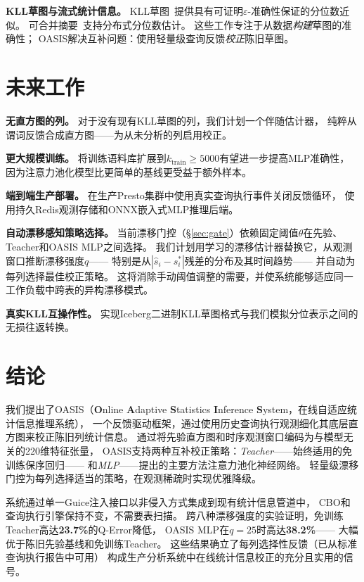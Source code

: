 \documentclass[runningheads]{llncs}
\begin{document}
\textbf{KLL草图与流式统计信息。}
KLL草图~\cite{ivkin2019kll}提供具有可证明$\varepsilon$-准确性保证的分位数近似。
可合并摘要~\cite{agarwal2013mergeable}支持分布式分位数估计。
这些工作专注于从数据\emph{构建}草图的准确性；
OASIS解决互补问题：使用轻量级查询反馈\emph{校正}陈旧草图。

\section{未来工作}
\label{sec:future}

\textbf{无直方图的列。}
对于没有现有KLL草图的列，我们计划一个伴随估计器，
纯粹从谓词反馈合成直方图——为从未分析的列启用校正。

\textbf{更大规模训练。}
将训练语料库扩展到$k_{\text{train}} \geq 5000$有望进一步提高MLP准确性，
因为注意力池化模型比更简单的基线更受益于额外样本。

\textbf{端到端生产部署。}
在生产Presto集群中使用真实查询执行事件关闭反馈循环，
使用持久Redis观测存储和ONNX嵌入式MLP推理后端。

\textbf{自动漂移感知策略选择。}
当前漂移门控（\S\ref{sec:gate}）依赖固定阈值$\theta$在先验、Teacher和OASIS MLP之间选择。
我们计划用学习的漂移估计器替换它，从观测窗口推断漂移强度$q$——
特别是从$|\hat{s}_i - s^*_i|$残差的分布及其时间趋势——
并自动为每列选择最佳校正策略。
这将消除手动阈值调整的需要，并使系统能够适应同一工作负载中跨表的异构漂移模式。

\textbf{真实KLL互操作性。}
实现Iceberg二进制KLL草图格式与我们模拟分位表示之间的无损往返转换。

\section{结论}
\label{sec:conclusion}

我们提出了OASIS（\textbf{O}nline \textbf{A}daptive \textbf{S}tatistics
\textbf{I}nference \textbf{S}ystem，在线自适应统计信息推理系统），
一个反馈驱动框架，通过使用历史查询执行观测细化其底层直方图来校正陈旧列统计信息。
通过将先验直方图和时序观测窗口编码为与模型无关的220维特征张量，
OASIS支持两种互补校正策略：\emph{Teacher}——始终适用的免训练保序回归——
和\emph{MLP}——提出的主要方法注意力池化神经网络。
轻量级漂移门控为每列选择适当的策略，在观测稀疏时实现优雅降级。

系统通过单一Guice注入接口以非侵入方式集成到现有统计信息管道中，
CBO和查询执行引擎保持不变，不需要表扫描。
跨八种漂移强度的实验证明，免训练Teacher高达\textbf{23.7\%}的Q-Error降低，
OASIS MLP在$q{=}25$时高达\textbf{38.2\%}——
大幅优于陈旧先验基线和免训练Teacher。
这些结果确立了每列选择性反馈（已从标准查询执行报告中可用）
构成生产分析系统中在线统计信息校正的充分且实用的信号。



\end{document}
